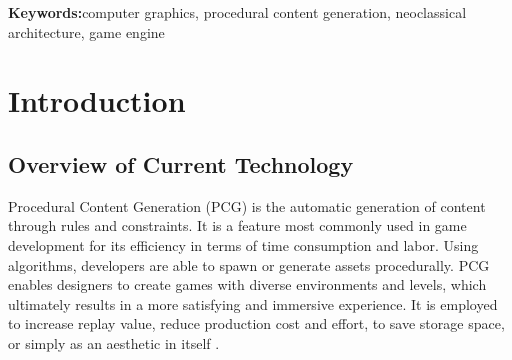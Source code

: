 \documentclass[manuscript,screen,12pt]{article}
\begin{document}
\begin{abstract}

Procedural Content Generation (PCG) is widely utilized for environment creation, yet current tools often lack the fidelity required to replicate specific architectural styles. This project presents \textit{Anito Builder}, a 3D scene editor and PCG framework designed to reconstruct the Neo-Classical architecture of De La Salle University (DLSU) Manila, with a primary focus on the St. La Salle Hall. The system integrates architectural principles—specifically the Corinthian order, symmetry, and proportionality—into a rule-based algorithmic pipeline to automate segment generation. Developed in C++ using the BGFX rendering library, the engine employs a subdivision algorithm to map modular, assets onto procedural grids. User evaluation indicate that the framework significantly reduces manual modeling labor. The system is also usable enough to be considered for specific needs. Future research is suggested to focus on exploring more ways for domain-specific PCG applications to be integrated in the asset development workflow of users.

\end{abstract}

\newcommand{\keywords}[1]{%
	\vspace{1.5em}
	\noindent\textbf{Keywords:}\quad #1
}
\keywords{computer graphics, procedural content generation, neoclassical architecture, game engine}

\newpage

\tableofcontents

\newpage

\listoffigures

\newpage

\listoftables

\newpage

\section{Introduction}

\subsection{Overview of Current Technology}
Procedural Content Generation (PCG) is the automatic generation of content through rules and constraints. It is a feature most commonly used in game development for its efficiency in terms of time consumption and labor. Using algorithms, developers are able to spawn or generate assets procedurally. PCG enables designers to create games with diverse environments and levels, which ultimately results in a more satisfying and immersive experience. It is employed to increase replay value, reduce production cost and effort, to save storage space, or simply as an aesthetic in itself \citep{summerville2017}.
\end{document}
